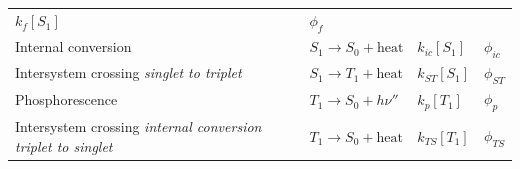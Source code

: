 \documentclass[
]{book}
\begin{document}
\begin{longtable}[]{@{}llll@{}}
\begin{minipage}[t]{0.16\columnwidth}
\(k_f[S_1]\)\strut
\end{minipage} & \begin{minipage}[t]{0.16\columnwidth}\raggedright
\(\phi _f\)\strut
\end{minipage}\tabularnewline
\begin{minipage}[t]{0.33\columnwidth}\raggedright
Internal conversion\strut
\end{minipage} & \begin{minipage}[t]{0.24\columnwidth}\raggedright
\(S_1 \longrightarrow S_0 + \textrm{heat}\)\strut
\end{minipage} & \begin{minipage}[t]{0.16\columnwidth}\raggedright
\(k_{ic}[S_1]\)\strut
\end{minipage} & \begin{minipage}[t]{0.16\columnwidth}\raggedright
\(\phi _{ic}\)\strut
\end{minipage}\tabularnewline
\begin{minipage}[t]{0.33\columnwidth}\raggedright
Intersystem crossing \emph{singlet to triplet}\strut
\end{minipage} & \begin{minipage}[t]{0.24\columnwidth}\raggedright
\(S_1 \longrightarrow T_1 + \textrm{heat}\)\strut
\end{minipage} & \begin{minipage}[t]{0.16\columnwidth}\raggedright
\(k_{ST}[S_1]\)\strut
\end{minipage} & \begin{minipage}[t]{0.16\columnwidth}\raggedright
\(\phi _{ST}\)\strut
\end{minipage}\tabularnewline
\begin{minipage}[t]{0.33\columnwidth}\raggedright
Phosphorescence\strut
\end{minipage} & \begin{minipage}[t]{0.24\columnwidth}\raggedright
\(T_1 \longrightarrow S_0 + h \nu''\)\strut
\end{minipage} & \begin{minipage}[t]{0.16\columnwidth}\raggedright
\(k_p[T_1]\)\strut
\end{minipage} & \begin{minipage}[t]{0.16\columnwidth}\raggedright
\(\phi _p\)\strut
\end{minipage}\tabularnewline
\begin{minipage}[t]{0.33\columnwidth}\raggedright
Intersystem crossing \emph{internal conversion triplet to singlet}\strut
\end{minipage} & \begin{minipage}[t]{0.24\columnwidth}\raggedright
\(T_1 \longrightarrow S_0 + \textrm{heat}\)\strut
\end{minipage} & \begin{minipage}[t]{0.16\columnwidth}\raggedright
\(k_{TS}[T_1]\)\strut
\end{minipage} & \begin{minipage}[t]{0.16\columnwidth}\raggedright
\(\phi _{TS}\)\strut
\end{minipage}\tabularnewline
\bottomrule
\end{longtable}
\end{document}
